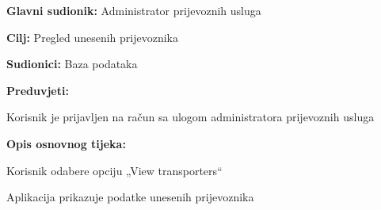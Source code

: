 					\noindent {}
					\begin{packed_item}
						\item \textbf{Glavni sudionik:} Administrator prijevoznih usluga
						\item  \textbf{Cilj:} Pregled unesenih prijevoznika
						\item  \textbf{Sudionici:} Baza podataka
						\item  \textbf{Preduvjeti:}
						\item[] \begin{packed_enum}
							\item Korisnik je prijavljen na račun sa ulogom administratora prijevoznih usluga
						\end{packed_enum}
						
						\item  \textbf{Opis osnovnog tijeka:}
						\item[] \begin{packed_enum}
							\item Korisnik odabere opciju „View transporters“
							\item Aplikacija prikazuje podatke unesenih prijevoznika
						\end{packed_enum}
					\end{packed_item}
					
